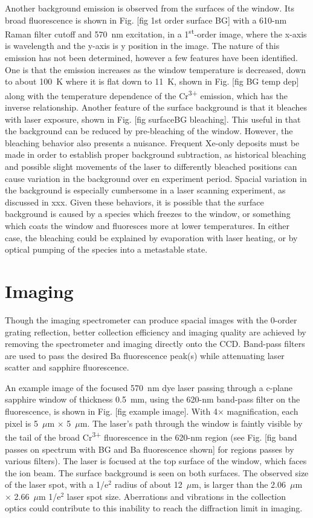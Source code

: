 Another background emission is observed from the surfaces of the window.  Its broad fluorescence is shown in Fig. [fig 1st order surface BG] with a 610-nm Raman filter cutoff and {\color{red}570~nm} excitation, in a 1\textsuperscript{st}-order image, where the x-axis is wavelength and the y-axis is y position in the image.  The nature of this emission has not been determined, however a few features have been identified.  One is that the emission increases as the window temperature is decreased, down to about 100~K where it is flat down to 11~K, shown in Fig. [fig BG temp dep] along with the temperature dependence of the Cr\textsuperscript{3+} emission, which has the inverse relationship.  Another feature of the surface background is that it bleaches with laser exposure, shown in Fig. [fig surfaceBG bleaching].  This useful in that the background can be reduced by pre-bleaching of the window.  However, the bleaching behavior also presents a nuisance.  Frequent Xe-only deposits must be made in order to establish proper background subtraction, as historical bleaching and possible slight movements of the laser to differently bleached positions can cause variation in the background over en experiment period.  Spacial variation in the background is especially cumbersome in a laser scanning experiment, as discussed in xxx.  Given these behaviors, it is possible that the surface background is caused by a species which freezes to the window, or something which coats the window and fluoresces more at lower temperatures.  In either case, the bleaching could be explained by evaporation with laser heating, or by optical pumping of the species into a metastable state.

\section{Imaging}
\label{imaging}

Though the imaging spectrometer can produce spacial images with the 0-order grating reflection, better collection efficiency and imaging quality are achieved by removing the spectrometer and imaging directly onto the CCD.  Band-pass filters are used to pass the desired Ba fluorescence peak(s) while attenuating laser scatter and sapphire fluorescence.

An example image of the focused 570~nm dye laser passing through a c-plane sapphire window of thickness 0.5~mm, using the 620-nm band-pass filter on the fluorescence, is shown in Fig. [fig example image].  With 4$\times$ magnification, each pixel is 5~$\mu$m $\times$ 5~$\mu$m.  The laser's path through the window is faintly visible by the tail of the broad Cr\textsuperscript{3+} fluorescence in the 620-nm region (see Fig. [fig band passes on spectrum with BG and Ba fluorescence shown] for regions passes by various filters).  The laser is focused at the top surface of the window, which faces the ion beam.  The surface background is seen on both surfaces.  The observed size of the laser spot, with a 1/e$^{2}$ radius of about 12~$\mu$m, is larger than the 2.06~$\mu$m $\times$ 2.66~$\mu$m 1/e$^{2}$ laser spot size.  Aberrations and vibrations in the collection optics could contribute to this inability to reach the diffraction limit in imaging.

